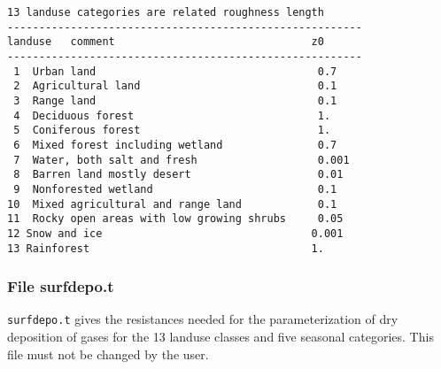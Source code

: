 \documentclass{egu}            %
\begin{document}
\begin{footnotesize}
\begin{verbatim}
13 landuse categories are related roughness length
--------------------------------------------------------
landuse   comment                               z0
--------------------------------------------------------
 1	Urban land                                   0.7	
 2	Agricultural land                            0.1
 3	Range land                                   0.1
 4	Deciduous forest                             1.
 5	Coniferous forest                            1.
 6	Mixed forest including wetland               0.7	
 7	Water, both salt and fresh                   0.001
 8	Barren land mostly desert                    0.01
 9	Nonforested wetland                          0.1
10	Mixed agricultural and range land            0.1
11	Rocky open areas with low growing shrubs     0.05
12 Snow and ice                                 0.001
13 Rainforest                                   1.
\end{verbatim}
\end{footnotesize}

\newpage

\subsubsection{File surfdepo.t}
\verb|surfdepo.t| gives the resistances needed for the parameterization of dry deposition of gases for the 13 landuse classes and five seasonal categories.
This file must not be changed by the user.\par
 
\end{document}
